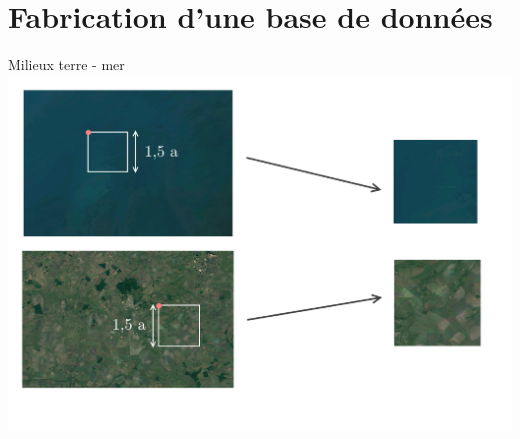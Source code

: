 \documentclass[ignorenonframetext,]{beamer}
\begin{document}


\section{Fabrication d'une base de données}

\begin{frame}{Milieux terre - mer}
	\includegraphics{fabricationImage.png}
\end{frame}
\end{document}
